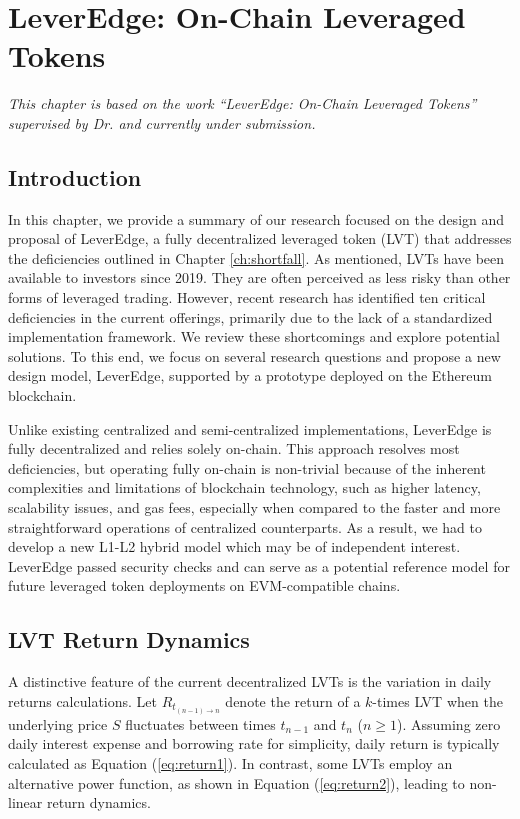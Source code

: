 
\chapter{LeverEdge: On-Chain Leveraged Tokens}\label{ch:leveredge}

\textit{This chapter is based on the work ``LeverEdge: On-Chain Leveraged Tokens'' supervised by Dr. \supv and currently under submission.}

\section{Introduction}
In this chapter, we provide a summary of our research focused on the design and proposal of LeverEdge, a fully decentralized leveraged token (LVT) that addresses the deficiencies outlined in Chapter \ref{ch:shortfall}. As mentioned, LVTs have been available to investors since 2019. They are often perceived as less risky than other forms of leveraged trading. However, recent research has identified ten critical deficiencies in the current offerings, primarily due to the lack of a standardized implementation framework. We review these shortcomings and explore potential solutions. To this end, we focus on several research questions and propose a new design model, LeverEdge, supported by a prototype deployed on the Ethereum blockchain. 

Unlike existing centralized and semi-centralized implementations, LeverEdge is fully decentralized and relies solely on-chain. This approach resolves most deficiencies, but operating fully on-chain is non-trivial because of the inherent complexities and limitations of blockchain technology, such as higher latency, scalability issues, and gas fees, especially when compared to the faster and more straightforward operations of centralized counterparts. As a result, we had to develop a new L1-L2 hybrid model which may be of independent interest. LeverEdge passed security checks and can serve as a potential reference model for future leveraged token deployments on EVM-compatible chains.

\section{LVT Return Dynamics}\label{appx:return}
A distinctive feature of the current decentralized LVTs is the variation in daily returns calculations. Let \( R_{t_{(n-1)\to n}} \) denote the return of a \(k\)-times LVT when the underlying price \( S \) fluctuates between times \( t_{n-1} \) and \( t_n \) (\(n \ge 1\)). Assuming zero daily interest expense and borrowing rate for simplicity, daily return is typically calculated as Equation (\ref{eq:return1}). In contrast, some LVTs employ an alternative power function, as shown in Equation (\ref{eq:return2}), leading to non-linear return dynamics.

